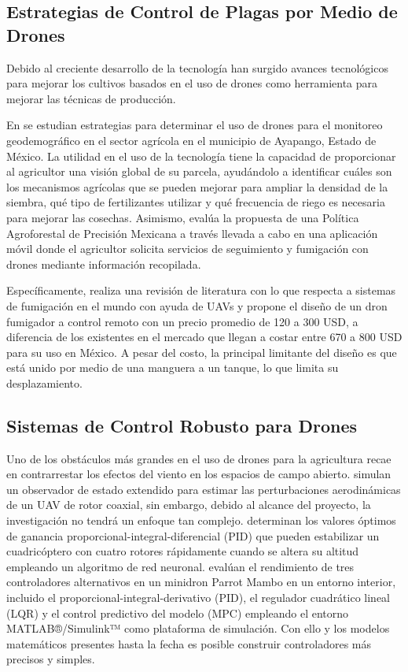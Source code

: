 \documentclass[11pt]{exam}
\begin{document}
        \subsection{Estrategias de Control de Plagas por Medio de Drones}\label{sec2.2}
        Debido al creciente desarrollo de la tecnología han surgido avances tecnológicos para mejorar los cultivos basados en el uso de drones como herramienta para mejorar las técnicas de producción. 
    
        En \textcite{teran-2019} se estudian estrategias para determinar el uso de drones para el monitoreo geodemogr\'afico en el sector agr\'icola en el municipio de Ayapango, Estado de M\'exico. La utilidad en el uso de la tecnología tiene la capacidad de proporcionar al agricultor una visión global de su parcela, ayud\'andolo a identificar cu\'ales son los mecanismos agr\'icolas que se pueden mejorar para ampliar la densidad de la siembra, qu\'e tipo de fertilizantes utilizar y qu\'e frecuencia de riego es necesaria para mejorar las cosechas. Asimismo, \textcite{montes-2020} eval\'ua la propuesta de una Pol\'itica Agroforestal de Precisi\'on Mexicana a trav\'es llevada a cabo en una aplicaci\'on m\'ovil donde el agricultor solicita servicios de seguimiento y fumigaci\'on con drones mediante informaci\'on recopilada. 

        Espec\'ificamente, \textcite{negrete-2018} realiza una revisi\'on de literatura con lo que respecta a sistemas de fumigaci\'on en el mundo con ayuda de UAVs y propone el diseño de un dron fumigador a control remoto con un precio promedio de 120 a 300 USD, a diferencia de los existentes en el mercado que llegan a costar entre 670 a 800 USD para su uso en M\'exico. A pesar del costo, la principal limitante del diseño es que est\'a unido por medio de una manguera a un tanque, lo que limita su desplazamiento.

        \subsection{Sistemas de Control Robusto para Drones}\label{sec2.3}
        Uno de los obst\'aculos m\'as grandes en el uso de drones para la agricultura recae en contrarrestar los efectos del viento en los espacios de campo abierto. \textcite{mokhtari-2020} simulan un observador de estado extendido para estimar las perturbaciones aerodinámicas de un UAV de rotor coaxial, sin embargo, debido al alcance del proyecto, la investigación no tendrá un enfoque tan complejo. \textcite{yoon-2021} determinan los valores óptimos de ganancia proporcional-integral-diferencial (PID) que pueden estabilizar un cuadricóptero con cuatro rotores rápidamente cuando se altera su altitud empleando un algoritmo de red neuronal. \textcite{okasha-2022} eval\'uan el rendimiento de tres controladores alternativos en un minidron Parrot Mambo en un entorno interior, incluido el proporcional-integral-derivativo (PID), el regulador cuadrático lineal (LQR) y el control predictivo del modelo (MPC) empleando el entorno MATLAB®/Simulink™ como plataforma de simulación. Con ello y los modelos matemáticos presentes hasta la fecha es posible construir controladores más precisos y simples.
\end{document}
